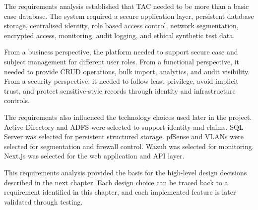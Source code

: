 The requirements analysis established that TAC needed to be more than a basic case database. The system required a secure application layer, persistent database storage, centralised identity, role based access control, network segmentation, encrypted access, monitoring, audit logging, and ethical synthetic test data.

From a business perspective, the platform needed to support secure case and subject management for different user roles. From a functional perspective, it needed to provide CRUD operations, bulk import, analytics, and audit visibility. From a security perspective, it needed to follow least privilege, avoid implicit trust, and protect sensitive-style records through identity and infrastructure controls.

The requirements also influenced the technology choices used later in the project. Active Directory and ADFS were selected to support identity and claims. SQL Server was selected for persistent structured storage. pfSense and VLANs were selected for segmentation and firewall control. Wazuh was selected for monitoring. Next.js was selected for the web application and API layer.

This requirements analysis provided the basis for the high-level design decisions described in the next chapter. Each design choice can be traced back to a requirement identified in this chapter, and each implemented feature is later validated through testing.

